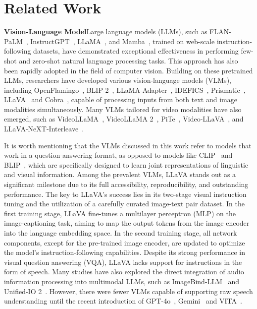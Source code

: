 \section{Related Work}
\textbf{Vision-Language Model}\quad Large language models (LLMs), such as FLAN-PaLM~\citep{chung2022scalinginstructionfinetunedlanguagemodels}, InstructGPT~\citep{ouyang2022traininglanguagemodelsfollow}, LLaMA~\citep{touvron2023llamaopenefficientfoundation}, and Mamba~\citep{gu_mamba_2024}, trained on web-scale instruction-following datasets, have demonstrated exceptional effectiveness in performing few-shot and zero-shot natural language processing tasks. This approach has also been rapidly adopted in the field of computer vision. Building on these pretrained LLMs, researchers have developed various vision-language models (VLMs), including OpenFlamingo~\citep{awadalla2023openflamingo}, BLIP-2~\citep{li2023blip2bootstrappinglanguageimagepretraining}, LLaMA-Adapter~\citep{zhang2024llamaadapterefficientfinetuninglanguage}, IDEFICS~\citep{laurencon_obelics_2023}, Prismatic~\citep{karamcheti_prismatic_2024}, LLaVA~\citep{liu2023visualinstructiontuning} and Cobra~\citep{zhao_cobra_2025}, capable of processing inputs from both text and image modalities simultaneously. Many VLMs tailored for video modalities have also emerged, such as VideoLLaMA~\citep{zhang_video-llama_2023}, VideoLLaMA 2~\citep{cheng_videollama_2024}, PiTe~\citep{liu_pite_2024}, Video-LLaVA~\citep{lin_video-llava_2024}, and LLaVA-NeXT-Interleave~\citep{li_llava-next-interleave_2024}.

It is worth mentioning that the VLMs discussed in this work refer to models that work in a question-answering format, as opposed to models like CLIP~\citep{radford2021learningtransferablevisualmodels} and BLIP~\citep{li2022blipbootstrappinglanguageimagepretraining}, which are specifically designed to learn joint representations of linguistic and visual information. Among the prevalent VLMs, LLaVA stands out as a significant milestone due to its full accessibility, reproducibility, and outstanding performance. The key to LLaVA's success lies in its two-stage visual instruction tuning and the utilization of a carefully curated image-text pair dataset. In the first training stage, LLaVA fine-tunes a multilayer perceptron (MLP) on the image-captioning task, aiming to map the output tokens from the image encoder into the language embedding space. In the second training stage, all network components, except for the pre-trained image encoder, are updated to optimize the model's instruction-following capabilities. Despite its strong performance in visual question answering (VQA), LLaVA lacks support for instructions in the form of speech. Many studies have also explored the direct integration of audio information processing into multimodal LLMs, such as ImageBind-LLM~\citep{han_imagebind-llm_2023} and Unified-IO 2~\citep{lu_unified-io_2024}. However, there were fewer VLMs capable of supporting raw speech understanding until the recent introduction of GPT-4o~\citep{openai2024gpt4}, Gemini~\citep{team_gemini_2024} and VITA~\citep{fu_vita_2024}.

